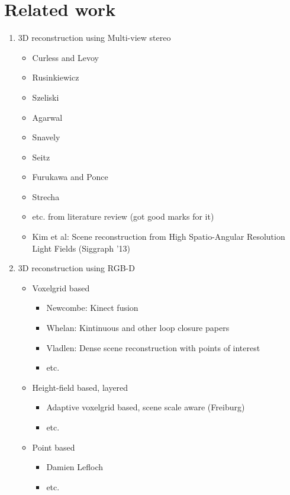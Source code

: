 \documentclass[12pt,a4paper]{article}
\begin{document}
\section{Related work}
	\begin{enumerate}
		\item 3D reconstruction using Multi-view stereo
		\begin{itemize}
			\item Curless and Levoy
			\item Rusinkiewicz
			\item Szeliski
			\item Agarwal
			\item Snavely
			\item Seitz
			\item Furukawa and Ponce
			\item Strecha
			\item etc. from literature review (got good marks for it)
			\item Kim et al: Scene reconstruction from High Spatio-Angular Resolution Light Fields (Siggraph '13)
		\end{itemize}

		\item 3D reconstruction using RGB-D
		\begin{itemize}
			\item Voxelgrid based
			\begin{itemize}
				\item Newcombe: Kinect fusion
				\item Whelan: Kintinuous and other loop closure papers
				\item Vladlen: Dense scene reconstruction with points of interest
				\item etc.
			\end{itemize}

			\item Height-field based, layered
			\begin{itemize}
				\item Adaptive voxelgrid based, scene scale aware (Freiburg)
				\item etc.
			\end{itemize}

			\item Point based
			\begin{itemize}
				\item Damien Lefloch
				\item etc.
			\end{itemize}


\end{itemize}
\end{enumerate}
\end{document}
